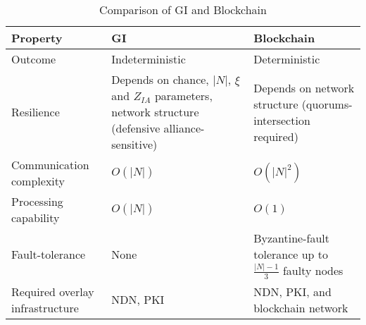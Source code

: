 \begin{table}[h!]
\centering
\begin{tabular}{ || m{3cm} | m{5cm}| m{5cm} || }
\hline
\hline
Property & GI & Blockchain \\
\hline\hline
Outcome & Indeterministic & Deterministic \\
\hline
Resilience & Depends on chance, $|N|$, $\xi$ and $Z_{IA}$ parameters, network structure (defensive alliance-sensitive) & Depends on network structure (quorums-intersection required) \\
\hline
Communication complexity & $O(|N|)$ & $O(|N|^2)$ \\
\hline
Processing capability & $O(|N|)$ & $O(1)$ \\
\hline
Fault-tolerance & None & Byzantine-fault tolerance up to $\frac{|N|-1}{3}$ faulty nodes \\
\hline
Required overlay infrastructure & NDN, PKI & NDN, PKI, and blockchain network \\
\hline
\end{tabular}
\caption{Comparison of GI and Blockchain}
\label{table:comparison}
\end{table}

